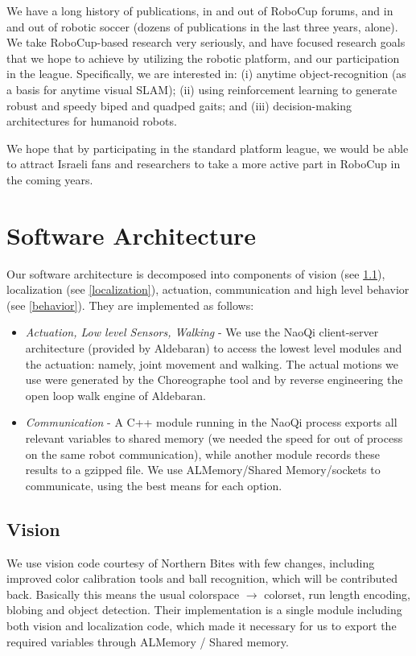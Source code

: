 \documentclass[runningheads,a4paper]{llncs}
\begin{document}
We have a long history of publications, in and out of RoboCup forums, and in
and out of robotic soccer (dozens of publications in the last three years, alone). We
take RoboCup-based research very seriously, and have focused research goals that we
hope to achieve by utilizing the robotic platform, and our participation in the league.
Specifically, we are interested in: (i) anytime object-recognition (as a basis for anytime
visual SLAM); (ii) using reinforcement learning to generate robust and speedy biped
and quadped gaits; and (iii) decision-making architectures for humanoid robots.

We hope that by participating in the standard platform league, we would be able to attract Israeli fans and researchers to take a more active part in RoboCup in the coming years.



\section{Software Architecture}
Our software architecture is decomposed into components of vision (see \ref{vision}), localization (see \ref{localization}), actuation, communication and high level behavior (see \ref{behavior}). They are implemented as follows:
\begin{itemize}
\item \emph{Actuation, Low level Sensors, Walking} - We use the NaoQi client-server architecture (provided by Aldebaran) to access the lowest level modules and the actuation: namely, joint movement and walking. The actual motions we use were generated by the Choreographe tool and by reverse engineering the open loop walk engine of Aldebaran.
\item \emph{Communication} - A C++ module running in the NaoQi process exports all relevant variables to shared memory (we needed the speed for out of process on the same robot communication), while another module records these results to a gzipped file. We use ALMemory/Shared Memory/sockets to communicate, using the best means for each option.
\end{itemize}

\subsection{Vision}
\label{vision}
We use vision code courtesy of Northern Bites \cite{northern,northern-repo} with few changes, including improved color calibration tools and ball recognition, which will be contributed back. Basically this means the usual colorspace $\rightarrow$ colorset, run length encoding, blobing and object detection. Their implementation is a single module including both vision and localization code, which made it necessary for us to export the required variables through ALMemory / Shared memory.
\end{document}
